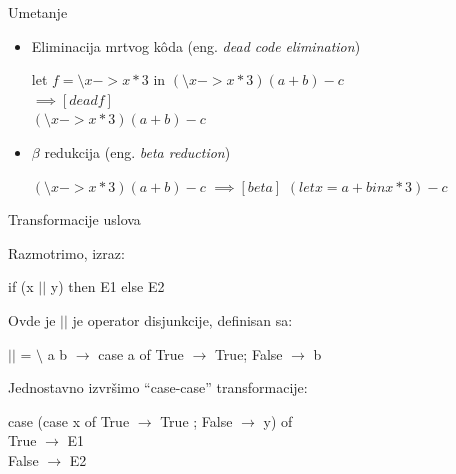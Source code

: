 \documentclass{beamer}
\begin{document}
\begin{frame}[fragile]{Umetanje}
	
	\begin{itemize}
		\item Eliminacija mrtvog k\^{o}da (eng. \emph{dead code elimination}) 
		\begin{block}{}
			let  $ f = \setminus x -> x*3 $ in $ (\setminus x -> x*3) (a + b) - c $
			\\$ \implies [dead f] $
			\\$ (\setminus x -> x*3) (a + b) - c $
		\end{block}
		\item $\beta$  redukcija (eng. \emph{beta reduction})
		\begin{block}{}
		$ (\setminus x -> x*3) (a + b) - c $
		$ \implies [beta] $
		$ (let { x = a+b } in x*3) - c $
		\end{block}
	\end{itemize}
\end{frame}

\begin{frame}[fragile]{Transformacije uslova}

	Razmotrimo, izraz:
	\begin{block}{}
	if (x $ || $ y) then E1 else E2
	\end{block}

	Ovde je $ || $ je operator disjunkcije, definisan sa:
	\begin{block}{}
	$ || $ = $ \setminus $ a b $ \rightarrow $ case a of {True $ \rightarrow $ True; False $ \rightarrow $ b}
	\end{block}

	Jednostavno izvršimo “case-case” transformacije:
	\begin{block}{}
		case (case x of {True $ \rightarrow $ True ; False $ \rightarrow $ y}) of\\
		True $ \rightarrow $ E1\\
		False $ \rightarrow $ E2
	\end{block}
\end{frame}
\end{document}
